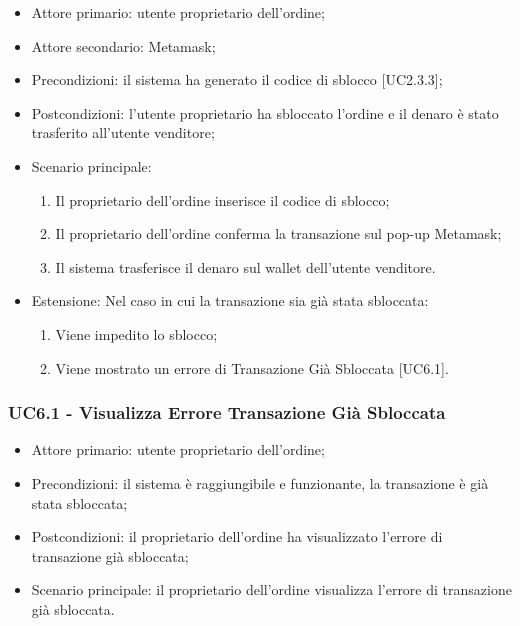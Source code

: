 \begin{itemize}
    \item Attore primario: utente proprietario dell'ordine;
    \item Attore secondario: Metamask\glo{};
    \item Precondizioni: il sistema ha generato il codice di sblocco [UC2.3.3];
    \item Postcondizioni: l'utente proprietario ha sbloccato l'ordine e il denaro è stato trasferito all'utente venditore;
    \item Scenario principale:
          \begin{enumerate}
              \item Il proprietario dell'ordine inserisce il codice di sblocco;
              \item Il proprietario dell'ordine conferma la transazione sul pop-up Metamask\glo{};
              \item Il sistema trasferisce il denaro sul wallet\glo{} dell'utente venditore.
          \end{enumerate}
    \item Estensione: Nel caso in cui la transazione sia già stata sbloccata:
          \begin{enumerate}
              \item Viene impedito lo sblocco;
              \item Viene mostrato un errore di Transazione Già Sbloccata [UC6.1].
          \end{enumerate}
\end{itemize}

\subsubsection{UC6.1 - Visualizza Errore Transazione Già Sbloccata}

\begin{itemize}
    \item Attore primario: utente proprietario dell'ordine;
    \item Precondizioni: il sistema è raggiungibile e funzionante, la transazione è già stata sbloccata;
    \item Postcondizioni: il proprietario dell'ordine ha visualizzato l'errore di transazione già sbloccata;
    \item Scenario principale: il proprietario dell'ordine visualizza l'errore di transazione già sbloccata.
\end{itemize}

